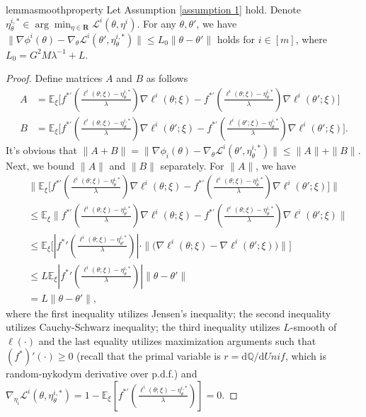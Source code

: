 \documentclass[twoside]{article} %
\theoremstyle{plain}
\theoremstyle{definition}
\theoremstyle{remark}
\newcommand{\fL}{\mathcal{L}}
\begin{document}
\begin{restatable}{lemma}{smoothproperty}\label{lemma: smooth of phi}
    Let Assumption \ref{assumption 1} hold. Denote $\eta_{{\theta}}^{i,*}\in \arg\min_{{\eta}\in \mathbf{R}}\fL^i({\theta},\eta^i)$. For any $\theta,\theta'$, we have$
        \|\nabla \phi^i({\theta})-\nabla_{{\theta}} \fL^i({\theta'},\eta^{i,*}_{{\theta}}) \|\leq L_0\|{\theta}-{\theta}' \|$
holds for $i\in[m]$, where $L_0=G^2M\lambda^{-1}+L$.
\end{restatable}
\begin{proof}
Define {matrices} $A$ and $B$ as follows
\begin{align}
    A&= \mathbb{E}_{\xi}\Big[f^{*'}(\frac{\ell^i({\theta};\xi)-\eta_{{\theta}}^{i,*}}{\lambda})\nabla \ell^i({\theta};\xi) - f^{*'}(\frac{\ell^i({\theta};\xi)-\eta_{{\theta}}^{i,*}}{\lambda})\nabla \ell^i({\theta}';\xi) \Big]\nonumber\\
    B&=\mathbb{E}_{\xi}\Big[f^{*'}(\frac{\ell^i({\theta};\xi)-\eta_{{\theta}}^{i,*}}{\lambda})\nabla \ell^i({\theta}';\xi)-f^{*'}(\frac{\ell^i({\theta'};\xi)-\eta_{{\theta}}^{i,*}}{\lambda})\nabla \ell^i({\theta'};\xi) \Big]. \nonumber
\end{align}
It's obvious that $\|A+B\| =\| \nabla \phi_i({\theta})-\nabla_{{\theta}} \fL^i({\theta'},\eta^{i,*}_{{\theta}})\|\leq \| A\|+\|B\|$. Next, we bound $\| A\|$ and $\| B\|$ separately.
For $\|A\|$, we have
\begin{align}
    &\Big\|\mathbb{E}_{\xi}\Big[f^{*'}(\frac{\ell^i({\theta};\xi)-\eta_{{\theta}}^{i,*}}{\lambda})\nabla \ell^i({\theta};\xi)-f^{*'}(\frac{\ell^i({\theta};\xi)-\eta_{{\theta}}^{i,*}}{\lambda})\nabla \ell^i({\theta}';\xi) \Big]\Big\|\nonumber\\
    &\leq \mathbb{E}_{\xi} \big\|f^{*'}(\frac{\ell^i({\theta};\xi)-\eta_{{\theta}}^{i,*}}{\lambda})\nabla \ell^i({\theta};\xi)-f^{*'}(\frac{\ell^i({\theta};\xi)-\eta_{{\theta}}^{i,*}}{\lambda})\nabla \ell^i({\theta}';\xi) \big\| \nonumber\\
    &\leq \mathbb{E}_{\xi}\Big[|{{f^*}'}(\frac{\ell^i({\theta};\xi)-\eta^{i,*}_{{\theta}'}}{\lambda})|\cdot \|\big(\nabla \ell^i({\theta};\xi)-\nabla \ell^i({\theta}';\xi) \big) \big\|\Big]\nonumber\\
    &\leq L \mathbb{E}_{\xi}|{{f^*}'}(\frac{\ell^i({\theta};\xi)-\eta^{i,*}_{{\theta}}}{\lambda}) |\|{\theta}-{\theta}'\|\nonumber\\
    &=L\|{\theta}-{\theta}'\|,
\end{align}
where the first inequality utilizes Jensen's inequality; the second inequality utilizes Cauchy-Schwarz inequality; the third inequality utilizes $L$-smooth of $\ell(\cdot)$ and the last equality utilizes maximization arguments such that $(f^{*})'(\cdot)\geq 0$ (recall that the primal variable is $r =\mathrm{d}\mathbb{Q}/\mathrm{d}\textit{Unif}$, which is random-nykodym derivative over p.d.f.) and $\nabla_{\eta_i}\fL^i(\theta,\eta_{\theta}^{i,*})=1-\mathbb{E}_\xi[f^{*'}(\frac{\ell^i({\theta};\xi)-\eta^{i,*}_{{\theta}}}{\lambda})]=0$.



\end{proof}
\end{document}
